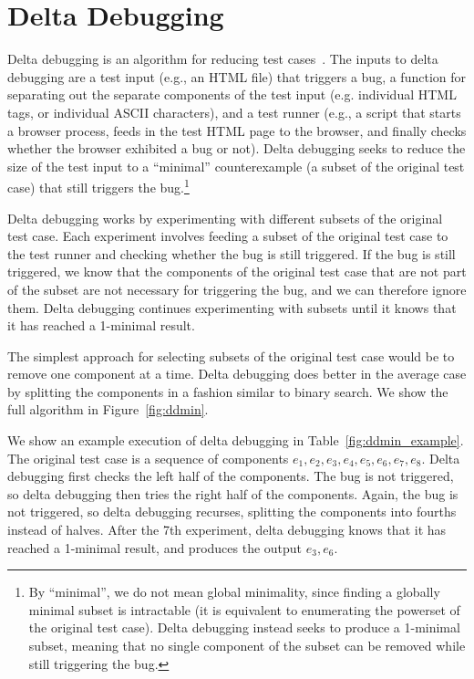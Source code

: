 \section{Delta Debugging}
\label{chap:ddmin}

Delta debugging is an algorithm for reducing test
cases~\cite{Zeller:1999:YMP:318773.318946,Zeller:2002:SIF:506201.506206}. The
inputs to delta debugging are a test input (e.g., an HTML file) that triggers a
bug, a function for separating out the separate components of the test
input (e.g. individual HTML tags, or individual ASCII characters), and a test
runner (e.g., a script that starts a browser process, feeds in the test HTML
page to the browser, and finally checks whether the browser exhibited a bug or
not). Delta debugging seeks to reduce the size of the test input to a
``minimal'' counterexample  (a subset of the original test case) that still
triggers the bug.\footnote{By ``minimal'', we do not mean global minimality,
since finding a globally minimal subset is intractable (it is equivalent to enumerating the
powerset of the original test case). Delta debugging instead seeks to produce a
1-minimal subset, meaning that no single component of the subset can be
removed while still triggering the bug.}

Delta debugging works by experimenting with different subsets of the original test
case. Each experiment involves feeding a subset of the original test case to the test runner
and checking whether the bug is still triggered. If the bug is still
triggered, we know that the components of the original test case that are not part of the
subset are not necessary for triggering the
bug, and we can therefore ignore them. Delta debugging continues experimenting
with subsets until it knows that it has reached a 1-minimal result.

The simplest approach for selecting subsets of the original test case would be
to remove one component at a time. Delta debugging does better in the average
case by splitting the components in a fashion similar to binary search. We
show the full algorithm in Figure~\ref{fig:ddmin}.

We show an example
execution of delta debugging in Table~\ref{fig:ddmin_example}. The original
test case is a sequence of components $e_1,e_2,e_3,e_4,e_5,e_6,e_7,e_8$. Delta
debugging first checks the left half of the components. The bug is not
triggered, so delta debugging then tries the right half of the components. Again, the
bug is not triggered, so delta debugging recurses, splitting the components
into fourths instead of halves. After the 7th experiment, delta debugging
knows that it has reached a 1-minimal result, and produces the output
$e_3,e_6$.

